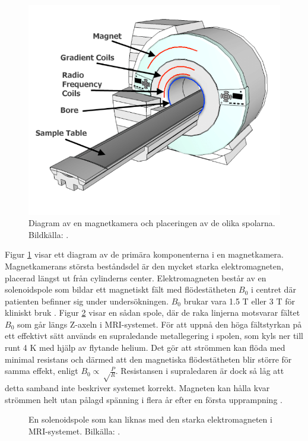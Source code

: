 \documentclass[11pt, a4paper]{article}
\begin{document}
\begin{figure}[hp]
	\centering
	\includegraphics[width=.8\textwidth]{mri_schematic}
	\caption{Diagram av en magnetkamera och placeringen av de olika spolarna. Bildkälla: \cite{fig:mri_spolar_diagram}.}
	\label{fig:mri_diagram}
\end{figure}

Figur \ref{fig:mri_diagram} visar ett diagram av de primära komponenterna i en magnetkamera. Magnetkamerans största beståndsdel är den mycket starka elektromagneten, placerad längst ut från cylinderns center. Elektromagneten består av en solenoidspole som bildar ett magnetiskt fält med flödestätheten $B_0$ i centret där patienten befinner sig under undersökningen. $B_0$ brukar vara 1.5 T eller 3 T för kliniskt bruk \parencite{understanding_mri}. Figur \ref{fig:solenoid} visar en sådan spole, där de raka linjerna motsvarar fältet $B_0$ som går längs Z-axeln i MRI-systemet. För att uppnå den höga fältstyrkan på ett effektivt sätt används en supraledande metallegering i spolen, som kyls ner till runt 4 K med hjälp av flytande helium. Det gör att strömmen kan flöda med minimal resistans och därmed att den magnetiska flödestätheten blir större för samma effekt, enligt $B_0\propto\sqrt\frac{P}{R}$. Resistansen i supraledaren är dock så låg att detta samband inte beskriver systemet korrekt. Magneten kan hålla kvar strömmen helt utan pålagd spänning i flera år efter en första upprampning \parencite{mri_for_radiologists}.

\begin{figure}[ht]
	\centering
	
	\caption{En solenoidspole som kan liknas med den starka elektromagneten i MRI-systemet. Bilkälla: \cite{fig:solenoid}.}
	\label{fig:solenoid}
\end{figure}
\end{document}

